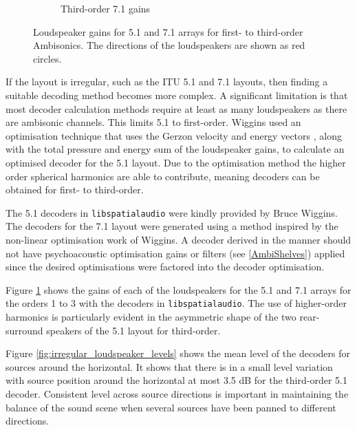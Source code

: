 \documentclass[12pt]{report}
\def\libspataud{\texttt{libspatialaudio}\xspace}
\begin{document}
\begin{figure}[tbp]
\begin{subfigure}{0.32\textwidth}
    \caption{\centering Third-order 7.1 gains}
  \end{subfigure}
  \hfill
  \caption{Loudspeaker gains for 5.1 and 7.1 arrays for first- to third-order Ambisonics. The directions of the loudspeakers are shown as red circles.}
  \label{fig:irregular_loudspeaker_gains}
\end{figure}

If the layout is irregular, such as the ITU 5.1 and 7.1 layouts, then finding a suitable decoding method becomes more complex.
A significant limitation is that most decoder calculation methods require at least as many loudspeakers as there are ambisonic channels.
This limits 5.1 to first-order.
Wiggins \cite{Wiggins2007} used an optimisation technique that uses the Gerzon velocity and energy vectors \cite{Gerzon1992a}, along with the total pressure and energy sum of the loudspeaker gains, to calculate an optimised decoder for the 5.1 layout.
Due to the optimisation method the higher order spherical harmonics are able to contribute, meaning decoders can be obtained for first- to third-order.

The 5.1 decoders in \libspataud were kindly provided by Bruce Wiggins. 
The decoders for the 7.1 layout were generated using a method inspired by the non-linear optimisation work of Wiggins.
A decoder derived in the manner should not have psychoacoustic optimisation gains or filters (see \cref{AmbiShelves}) applied since the desired optimisations were factored into the decoder optimisation.

Figure \ref{fig:irregular_loudspeaker_gains} shows the gains of each of the loudspeakers for the 5.1 and 7.1 arrays for the orders 1 to 3 with the decoders in \libspataud.
The use of higher-order harmonics is particularly evident in the asymmetric shape of the two rear-surround speakers of the 5.1 layout for third-order.

Figure \ref{fig:irregular_loudspeaker_levels} shows the mean level of the decoders for sources around the horizontal.
It shows that there is in a small level variation with source position around the horizontal at most 3.5 dB for the third-order 5.1 decoder.
Consistent level across source directions is important in maintaining the balance of the sound scene when several sources have been panned to different directions.
\end{document}
